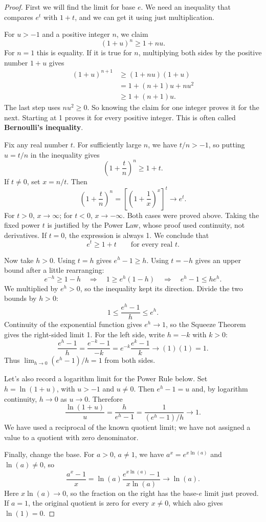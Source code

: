 
\begin{proof}
First we will find the limit for base $e$. We need an inequality that
compares $e^t$ with $1+t$, and we can get it using just multiplication.

For $u>-1$ and a positive integer $n$, we claim
$$(1+u)^n\geq1+nu.$$
For $n=1$ this is equality. If it is true for $n$, multiplying both
sides by the positive number $1+u$ gives
\begin{align*}
(1+u)^{n+1}
&\geq(1+nu)(1+u)\\
&=1+(n+1)u+nu^2\\
&\geq1+(n+1)u.
\end{align*}
The last step uses $nu^2\geq0$. So knowing the claim for one integer
proves it for the next. Starting at 1 proves it for every positive integer.
This is often called \textbf{Bernoulli's inequality}.

Fix any real number $t$. For sufficiently large $n$, we have $t/n>-1$,
so putting $u=t/n$ in the inequality gives
$$\left(1+\frac tn\right)^n\geq1+t.$$
If $t\ne0$, set $x=n/t$. Then
$$
\left(1+\frac tn\right)^n
=\left[\left(1+\frac1x\right)^x\right]^t\longrightarrow e^t.
$$
For $t>0$, $x\to\infty$; for $t<0$, $x\to-\infty$.
Both cases were proved above. Taking the fixed power $t$ is justified
by the Power Law, whose proof used continuity, not derivatives.
If $t=0$, the expression is always 1. We conclude that
$$e^t\geq1+t\qquad\text{for every real }t.$$

Now take $h>0$. Using $t=h$ gives $e^h-1\geq h$.
Using $t=-h$ gives an upper bound after a little rearranging:
$$e^{-h}\geq1-h
\quad\Longrightarrow\quad
1\geq e^h(1-h)
\quad\Longrightarrow\quad
e^h-1\leq he^h.$$
We multiplied by $e^h>0$, so the inequality kept its direction.
Divide the two bounds by $h>0$:
$$1\leq\frac{e^h-1}{h}\leq e^h.$$
Continuity of the exponential function gives $e^h\to1$, so the
Squeeze Theorem gives the right-sided limit 1. For the left side,
write $h=-k$ with $k>0$:
$$
\frac{e^h-1}{h}
=\frac{e^{-k}-1}{-k}
=e^{-k}\frac{e^k-1}{k}\longrightarrow(1)(1)=1.
$$
Thus $\lim_{h\to0}(e^h-1)/h=1$ from both sides.

Let's also record a logarithm limit for the Power Rule below.
Set $h=\ln(1+u)$, with $u>-1$ and $u\ne0$. Then $e^h-1=u$ and,
by logarithm continuity, $h\to0$ as $u\to0$. Therefore
$$
\frac{\ln(1+u)}u
=\frac{h}{e^h-1}
=\frac1{(e^h-1)/h}\longrightarrow1.
$$
We have used a reciprocal of the known quotient limit; we have not
assigned a value to a quotient with zero denominator.

Finally, change the base. For $a>0$, $a\ne1$, we have
$a^x=e^{x\ln(a)}$ and $\ln(a)\ne0$, so
$$
\frac{a^x-1}{x}
=\ln(a)\frac{e^{x\ln(a)}-1}{x\ln(a)}
\longrightarrow\ln(a).
$$
Here $x\ln(a)\to0$, so the fraction on the right has the base-$e$
limit just proved. If $a=1$, the original quotient is zero for every
$x\ne0$, which also gives $\ln(1)=0$.
\end{proof}




